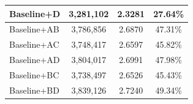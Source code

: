 \begin{table}[ht]
\begin{tabular}{@{}lccc@{}}
Baseline+D             & 3,281,102                                                                                                                                                 & 2.3281                                                                                                                                                 & 27.64\% \\ \midrule %
Baseline+AB            & 3,786,856                                                                                                                                                 & 2.6870                                                                                                                                                 & 47.31\% \\ %
Baseline+AC            & 3,748,417                                                                                                                                                 & 2.6597                                                                                                                                                 & 45.82\% \\ %
Baseline+AD            & 3,804,017                                                                                                                                                 & 2.6991                                                                                                                                                 & 47.98\% \\ %
Baseline+BC            & 3,738,497                                                                                                                                                 & 2.6526                                                                                                                                                 & 45.43\% \\ %
Baseline+BD            & 3,839,126                                                                                                                                                 & 2.7240                                                                                                                                                 & 49.34\% \\ %

\end{tabular}
\end{table}
